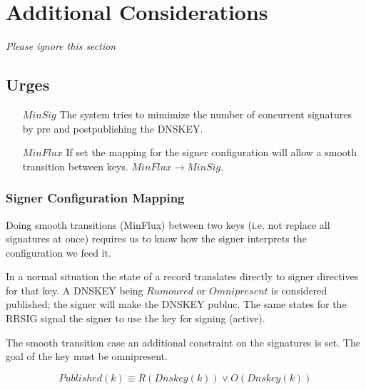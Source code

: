 \documentclass[twoside,english, a4paper]{article}
\begin{document}
\section{Additional Considerations}

\emph{Please ignore this section}

\subsection{Urges}


\begin{itemize}
\item[$MinSig$] The system tries to mimimize the number of concurrent
signatures by pre and postpublishing the DNSKEY.
\item[$MinFlux$] If set the mapping for 
the signer configuration will allow a smooth transition between keys.
$MinFlux \rightarrow MinSig$.
\end{itemize}

\subsubsection{Signer Configuration Mapping}

Doing smooth transitions (MinFlux) between two keys (i.e. not replace all 
signatures at once) requires us to know how the signer interprets the
configuration we feed it. 

In a normal situation the state of a record translates directly to 
signer directives for that key. A DNSKEY being $Rumoured$ or $Omnipresent$
is considered published; the signer will make the DNSKEY publuc. The
same states for the RRSIG signal the signer to use the key for signing 
(active).

The smooth transition case an additional constraint on the signatures 
is set. The goal of the key must be omnipresent.

\begin{equation}
Published(k) \equiv R(Dnskey(k)) \vee O(Dnskey(k))
\end{equation}
\end{document}
